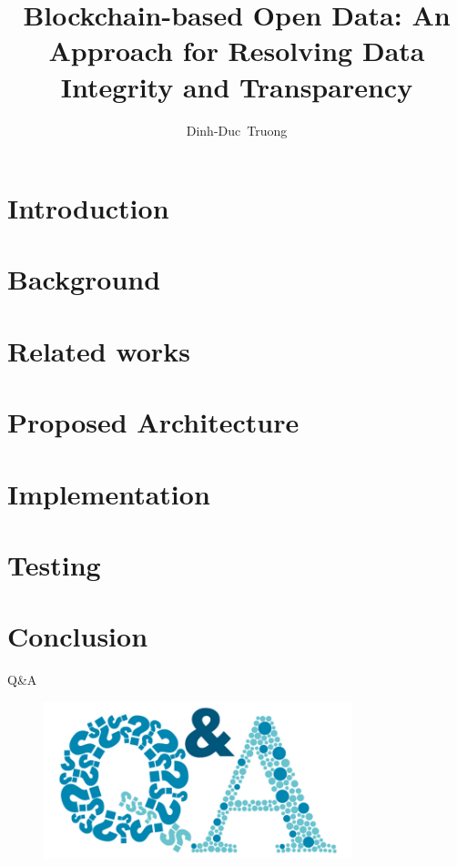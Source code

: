 \documentclass[11pt]{beamer}
\title[Blockchain-based Open Data]{Blockchain-based Open Data: An Approach for Resolving Data Integrity and Transparency}
\author[Dinh-Duc Truong]
{Dinh-Duc~Truong}
\begin{document}


\section{Introduction} 


\section{Background}


\section{Related works}


\section{Proposed Architecture}


\section{Implementation}


\section{Testing}


\section{Conclusion}



\begin{frame}{Q\&A}
    \begin{figure}
        \centering
        \includegraphics[width=0.8\textwidth,height=0.4\textwidth]{img/Q-A.png}
    \end{figure}
\end{frame}



\end{document}
